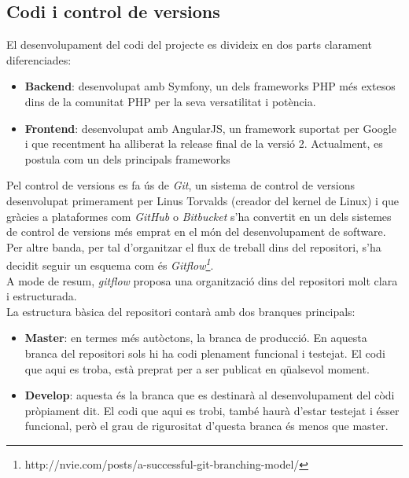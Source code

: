 \subsection{Codi i control de versions}

El desenvolupament del codi del projecte es divideix en dos parts clarament diferenciades:
\begin{itemize}
	\item \textbf{Backend}: desenvolupat amb Symfony, un dels frameworks PHP més extesos dins de la comunitat PHP per la seva versatilitat i potència.
	\item \textbf{Frontend}: desenvolupat amb AngularJS, un framework suportat per Google i  que recentment ha alliberat la release final de la versió 2. Actualment, es postula com un dels principals frameworks 
\end{itemize}

Pel control de versions es fa ús de \textit{Git}, un sistema de control de versions desenvolupat primerament per Linus Torvalds (creador del kernel de Linux) i que gràcies a plataformes com \textit{GitHub} o \textit{Bitbucket} s'ha convertit en un dels sistemes de control de versions més emprat en el món del desenvolupament de software.\\
\newline Per altre banda, per tal d'organitzar el flux de treball dins del repositori, s'ha decidit seguir un esquema com és \textit{Gitflow\footnote{http://nvie.com/posts/a-successful-git-branching-model/}}.\\
A mode de resum, \textit{gitflow} proposa una organització dins del repositori molt clara i estructurada. \\
\newline La estructura bàsica del repositori contarà amb dos branques principals:
\begin{itemize}
	\item \textbf{Master}: en termes més autòctons, la branca de producció. En aquesta branca del repositori sols hi ha codi plenament funcional i testejat. El codi que aqui es troba, està preprat per a ser publicat en qüalsevol moment.
	\item \textbf{Develop}: aquesta és la branca que es destinarà al desenvolupament del còdi pròpiament dit. El codi que aqui es trobi, també haurà d'estar testejat i ésser funcional, però el grau de rigurositat d'questa branca és menos que master.
\end{itemize}

